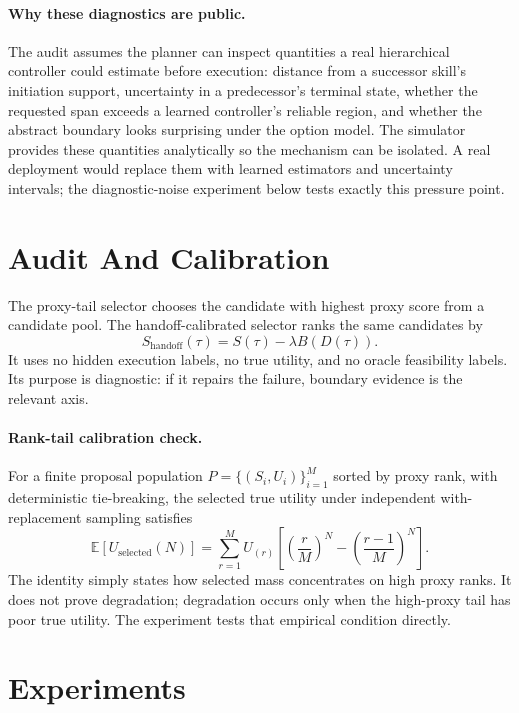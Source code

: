 \documentclass{article}
\begin{document}
\paragraph{Why these diagnostics are public.}
The audit assumes the planner can inspect quantities a real hierarchical controller could estimate before execution: distance from a successor skill's initiation support, uncertainty in a predecessor's terminal state, whether the requested span exceeds a learned controller's reliable region, and whether the abstract boundary looks surprising under the option model. The simulator provides these quantities analytically so the mechanism can be isolated. A real deployment would replace them with learned estimators and uncertainty intervals; the diagnostic-noise experiment below tests exactly this pressure point.

\section{Audit And Calibration}

The proxy-tail selector chooses the candidate with highest proxy score from a candidate pool. The handoff-calibrated selector ranks the same candidates by
\[
S_{\mathrm{handoff}}(\tau)=S(\tau)-\lambda B(D(\tau)).
\]
It uses no hidden execution labels, no true utility, and no oracle feasibility labels. Its purpose is diagnostic: if it repairs the failure, boundary evidence is the relevant axis.

\paragraph{Rank-tail calibration check.}
For a finite proposal population \(P=\{(S_i,U_i)\}_{i=1}^M\) sorted by proxy rank, with deterministic tie-breaking, the selected true utility under independent with-replacement sampling satisfies
\[
\mathbb{E}[U_{\mathrm{selected}}(N)]
=\sum_{r=1}^{M} U_{(r)}
\left[\left(\frac{r}{M}\right)^N-\left(\frac{r-1}{M}\right)^N\right].
\]
The identity simply states how selected mass concentrates on high proxy ranks. It does not prove degradation; degradation occurs only when the high-proxy tail has poor true utility. The experiment tests that empirical condition directly.

\section{Experiments}
\end{document}
